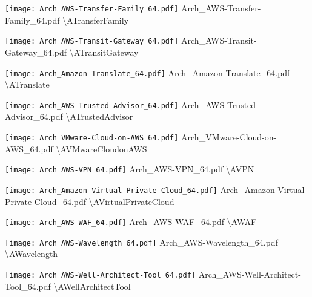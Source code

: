  {\texttt{[image: Arch\_AWS-Transfer-Family\_64.pdf]}} {Arch\_AWS-Transfer-Family\_64.pdf} {{\textbackslash}ATransferFamily}

 {\texttt{[image: Arch\_AWS-Transit-Gateway\_64.pdf]}} {Arch\_AWS-Transit-Gateway\_64.pdf} {{\textbackslash}ATransitGateway}

 {\texttt{[image: Arch\_Amazon-Translate\_64.pdf]}} {Arch\_Amazon-Translate\_64.pdf} {{\textbackslash}ATranslate}

 {\texttt{[image: Arch\_AWS-Trusted-Advisor\_64.pdf]}} {Arch\_AWS-Trusted-Advisor\_64.pdf} {{\textbackslash}ATrustedAdvisor}

 {\texttt{[image: Arch\_VMware-Cloud-on-AWS\_64.pdf]}} {Arch\_VMware-Cloud-on-AWS\_64.pdf} {{\textbackslash}AVMwareCloudonAWS}

 {\texttt{[image: Arch\_AWS-VPN\_64.pdf]}} {Arch\_AWS-VPN\_64.pdf} {{\textbackslash}AVPN}

 {\texttt{[image: Arch\_Amazon-Virtual-Private-Cloud\_64.pdf]}} {Arch\_Amazon-Virtual-Private-Cloud\_64.pdf} {{\textbackslash}AVirtualPrivateCloud}

 {\texttt{[image: Arch\_AWS-WAF\_64.pdf]}} {Arch\_AWS-WAF\_64.pdf} {{\textbackslash}AWAF}

 {\texttt{[image: Arch\_AWS-Wavelength\_64.pdf]}} {Arch\_AWS-Wavelength\_64.pdf} {{\textbackslash}AWavelength}

 {\texttt{[image: Arch\_AWS-Well-Architect-Tool\_64.pdf]}} {Arch\_AWS-Well-Architect-Tool\_64.pdf} {{\textbackslash}AWellArchitectTool}

